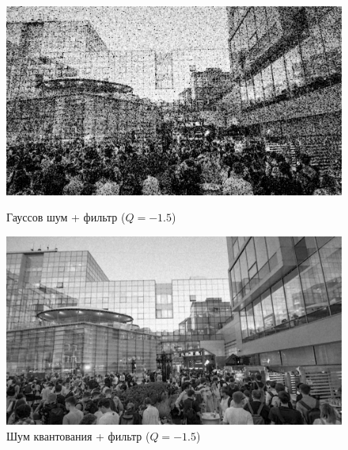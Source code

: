 \documentclass[a4paper]{article}
\begin{document}
\begin{figure}[H]
    \begin{minipage}{0.49\textwidth}
        \centering \includegraphics[width=\textwidth]{images/2_low_filters/gaussian - contrharmonic (Q=-1.5).jpg}
        \caption{Гауссов шум + фильтр ($Q = -1.5$)}
    \end{minipage}\hfill
    \begin{minipage}{0.49\textwidth}
        \centering \includegraphics[width=\textwidth]{images/2_low_filters/poisson - contrharmonic (Q=-1.5).jpg}
        \caption{Шум квантования + фильтр ($Q = -1.5$)}
    \end{minipage}
\end{figure}
\end{document}
